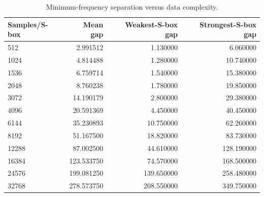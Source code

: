 \begin{table}[t]
\centering
\caption{Minimum-frequency separation versus data complexity.}
\label{tab:s3-gap-statistics}
\begin{tabular}{lrrr}
\toprule
Samples/S-box & Mean gap & Weakest-S-box gap & Strongest-S-box gap \\
\midrule
512 & 2.991512 & 1.130000 & 6.060000 \\
1024 & 4.814488 & 1.280000 & 10.740000 \\
1536 & 6.759714 & 1.540000 & 15.380000 \\
2048 & 8.760238 & 1.780000 & 19.850000 \\
3072 & 14.190179 & 2.800000 & 29.380000 \\
4096 & 20.591369 & 4.450000 & 40.450000 \\
6144 & 35.230893 & 10.750000 & 62.260000 \\
8192 & 51.167500 & 18.820000 & 83.730000 \\
12288 & 87.002500 & 44.610000 & 128.190000 \\
16384 & 123.533750 & 74.570000 & 168.500000 \\
24576 & 199.081250 & 139.650000 & 258.480000 \\
32768 & 278.573750 & 208.550000 & 349.750000 \\
\bottomrule
\end{tabular}
\end{table}
